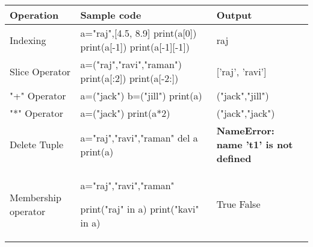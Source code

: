 

\begin{flushleft}

	
	\begin{tabulary}{1.0\textwidth}{|p{7em}|p{10em}|p{7em}|}

		\toprule

		\textbf{Operation} & \textbf{Sample code}  & \textbf{Output} \\

		\midrule

		Indexing & a="raj",[4.5, 8.9] \newline print(a[0]) \newline print(a[-1])  \newline print(a[-1][-1]) & raj \newline [4.5, 8.9]  \\

		\hline

		Slice Operator & a=("raj","ravi","raman") \newline print(a[:2]) \newline print(a[-2:]) & ['raj', 'ravi']   \\

		\hline

		"+" Operator & a=("jack") \newline b=("jill") \newline print(a) & ("jack","jill") \\

		\hline

		"*" Operator & a=("jack") \newline print(a*2) & ("jack","jack") \\

		\hline

		Delete Tuple & a="raj","ravi","raman" \newline del a \newline print(a) & \textbf{NameError: name 't1' is not defined} \\

		\hline

		Membership operator & a="raj","ravi","raman" \newline 

		print("raj" in a) \newline print("kavi" in a) & True \newline False \\

		\bottomrule

	\end{tabulary}

	
	
\end{flushleft}

\newpage

